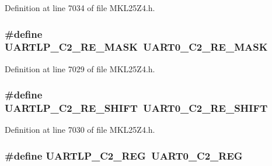 Definition at line 7034 of file M\+K\+L25\+Z4.\+h.

\subsubsection[{\texorpdfstring{U\+A\+R\+T\+L\+P\+\_\+\+C2\+\_\+\+R\+E\+\_\+\+M\+A\+SK}{UARTLP_C2_RE_MASK}}]{\setlength{\rightskip}{0pt plus 5cm}\#define U\+A\+R\+T\+L\+P\+\_\+\+C2\+\_\+\+R\+E\+\_\+\+M\+A\+SK~{\bf U\+A\+R\+T0\+\_\+\+C2\+\_\+\+R\+E\+\_\+\+M\+A\+SK}}\hypertarget{group___backward___compatibility___symbols_ga2e5e77f4d10c7c781b36e3d7083daa97}{}\label{group___backward___compatibility___symbols_ga2e5e77f4d10c7c781b36e3d7083daa97}


Definition at line 7029 of file M\+K\+L25\+Z4.\+h.

\subsubsection[{\texorpdfstring{U\+A\+R\+T\+L\+P\+\_\+\+C2\+\_\+\+R\+E\+\_\+\+S\+H\+I\+FT}{UARTLP_C2_RE_SHIFT}}]{\setlength{\rightskip}{0pt plus 5cm}\#define U\+A\+R\+T\+L\+P\+\_\+\+C2\+\_\+\+R\+E\+\_\+\+S\+H\+I\+FT~{\bf U\+A\+R\+T0\+\_\+\+C2\+\_\+\+R\+E\+\_\+\+S\+H\+I\+FT}}\hypertarget{group___backward___compatibility___symbols_ga7d8e4d4ef51751e7d193373f71e86458}{}\label{group___backward___compatibility___symbols_ga7d8e4d4ef51751e7d193373f71e86458}


Definition at line 7030 of file M\+K\+L25\+Z4.\+h.

\subsubsection[{\texorpdfstring{U\+A\+R\+T\+L\+P\+\_\+\+C2\+\_\+\+R\+EG}{UARTLP_C2_REG}}]{\setlength{\rightskip}{0pt plus 5cm}\#define U\+A\+R\+T\+L\+P\+\_\+\+C2\+\_\+\+R\+EG~{\bf U\+A\+R\+T0\+\_\+\+C2\+\_\+\+R\+EG}}\hypertarget{group___backward___compatibility___symbols_gaa736a6d32a0a89fa86aa0517b0c6f5d6}{}\label{group___backward___compatibility___symbols_gaa736a6d32a0a89fa86aa0517b0c6f5d6}


